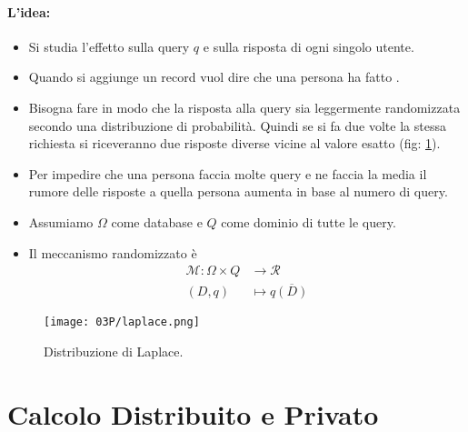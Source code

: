 \paragraph{L'idea:}

\begin{itemize}
  \item Si studia l'effetto sulla query $q$ e sulla risposta di ogni singolo utente. 
  \item Quando si aggiunge un record vuol dire che una persona ha fatto . 
  \item Bisogna fare in modo che la risposta alla query sia leggermente randomizzata secondo una distribuzione di probabilità. Quindi se si fa due volte la stessa richiesta si riceveranno due risposte diverse vicine al valore esatto (fig: \ref{fig:lp}).
  \item Per impedire che una persona faccia molte query e ne faccia la media il rumore delle risposte a quella persona aumenta in base al numero di query.
  \item Assumiamo $\Omega$ come database e $Q$ come dominio di tutte le query.
  \item Il meccanismo randomizzato è $$\begin{aligned}
\mathcal{M}: \Omega \times Q &\to \mathcal{R} \\
(D, q) &\mapsto q\overline{(D)}
\end{aligned}$$
\end{itemize}

\begin{figure}[h]
    \centering
    \texttt{[image: 03P/laplace.png]}
    \caption{Distribuzione di Laplace.}
    \label{fig:lp}
\end{figure}




\section{Calcolo Distribuito e Privato}
